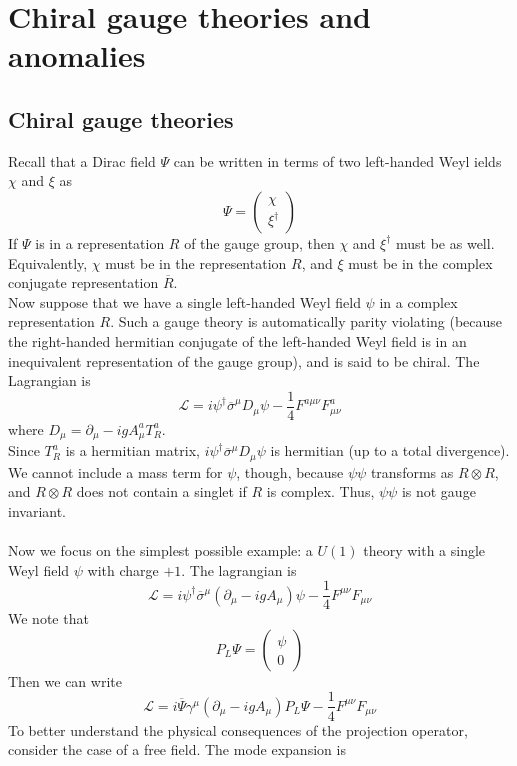 \documentclass[cyan]{elegantnote}
\begin{document}
\section{Chiral gauge theories and anomalies}
\subsection{Chiral gauge theories}
Recall that a Dirac field $\Psi$ can be written in terms of two left-handed Weyl ields $\chi$ and $\xi$ as
\[\Psi = \begin{pmatrix}\chi\\ \xi^{\dagger} \end{pmatrix}\] If $\Psi$ is in a representation $R$ of the gauge group, then $\chi$ and $\xi^{\dagger}$ must be as well. Equivalently, $\chi$ must be in the representation $R$, and $\xi$ must be in the complex conjugate representation $\overline{R}$.
\\
Now suppose that we have a single left-handed Weyl field $\psi$ in a complex representation $R$. Such a gauge theory is automatically parity violating (because the right-handed hermitian conjugate of the left-handed Weyl field is in an inequivalent representation of the gauge group), and is said to be chiral.
The Lagrangian is
\[\mathcal{L} = i\psi^{\dagger} \overline{\sigma}^{\mu} D_{\mu} \psi - \frac{1}{4}F^{a\mu\nu}F^a_{\mu\nu}\]
where $D_{\mu} = \partial_{\mu} - igA^{a}_{\mu} T^a_R$.
\\
Since $T^a_R$ is a hermitian matrix, $i\psi^{\dagger} \overline{\sigma}^{\mu} D_{\mu} \psi$ is hermitian (up to a total divergence). We cannot include a mass term for $\psi$, though, because $\psi\psi$ transforms as $R \otimes R$, and $R \otimes R$ does not contain a singlet if $R$ is complex. Thus, $\psi\psi$ is not gauge invariant. 
\\ \\
Now we focus on the simplest possible example: a $U(1)$ theory with a single Weyl field $\psi$ with charge $+1$. The lagrangian is
\[\mathcal{L} = i\psi^{\dagger} \overline{\sigma}^{\mu} (\partial_{\mu} - igA_{\mu}) \psi - \frac{1}{4}F^{\mu\nu}F_{\mu\nu}\]
We note that
\[P_L \Psi = \begin{pmatrix}
\psi \\ 0
\end{pmatrix}\]
Then we can write
\[\mathcal{L} = i\overline{\Psi} \gamma^{\mu} (\partial_{\mu} - igA_{\mu}) P_L\Psi - \frac{1}{4}F^{\mu\nu}F_{\mu\nu}\]
To better understand the physical consequences of the projection operator, consider the case of a free field. The mode expansion is
\end{document}
